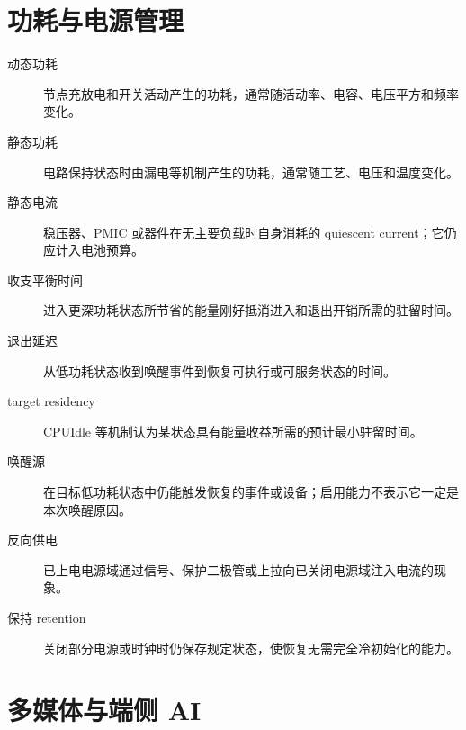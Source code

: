 \section{功耗与电源管理}

\begin{description}
  \item[动态功耗] 节点充放电和开关活动产生的功耗，通常随活动率、电容、电压平方和频率变化。
  \item[静态功耗] 电路保持状态时由漏电等机制产生的功耗，通常随工艺、电压和温度变化。
  \item[静态电流] 稳压器、PMIC 或器件在无主要负载时自身消耗的 quiescent current；它仍应计入电池预算。
  \item[收支平衡时间] 进入更深功耗状态所节省的能量刚好抵消进入和退出开销所需的驻留时间。
  \item[退出延迟] 从低功耗状态收到唤醒事件到恢复可执行或可服务状态的时间。
  \item[target residency] CPUIdle 等机制认为某状态具有能量收益所需的预计最小驻留时间。
  \item[唤醒源] 在目标低功耗状态中仍能触发恢复的事件或设备；启用能力不表示它一定是本次唤醒原因。
  \item[反向供电] 已上电电源域通过信号、保护二极管或上拉向已关闭电源域注入电流的现象。
  \item[保持 retention] 关闭部分电源或时钟时仍保存规定状态，使恢复无需完全冷初始化的能力。
\end{description}

\section{多媒体与端侧 AI}

